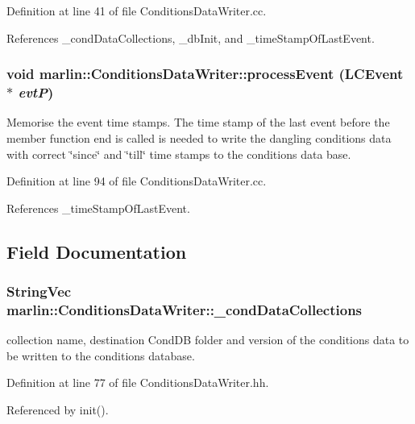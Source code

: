Definition at line 41 of file ConditionsDataWriter.cc.

References \_\-condDataCollections, \_\-dbInit, and \_\-timeStampOfLastEvent.
\subsubsection[{processEvent}]{\setlength{\rightskip}{0pt plus 5cm}void marlin::ConditionsDataWriter::processEvent (LCEvent $\ast$ {\em evtP})}\label{classmarlin_1_1ConditionsDataWriter_afa20ee1d0fcaa87334896a5e5b86920e}


Memorise the event time stamps. The time stamp of the last event before the member function end is called is needed to write the dangling conditions data with correct \char`\"{}since\char`\"{} and \char`\"{}till\char`\"{} time stamps to the conditions data base. 

Definition at line 94 of file ConditionsDataWriter.cc.

References \_\-timeStampOfLastEvent.

\subsection{Field Documentation}
\subsubsection[{\_\-condDataCollections}]{\setlength{\rightskip}{0pt plus 5cm}StringVec {\bf marlin::ConditionsDataWriter::\_\-condDataCollections}\hspace{0.3cm}{\ttfamily  [protected]}}\label{classmarlin_1_1ConditionsDataWriter_aec7c975d8f23f11e20dc1911ce57bb2c}


collection name, destination CondDB folder and version of the conditions data to be written to the conditions database. 

Definition at line 77 of file ConditionsDataWriter.hh.

Referenced by init().
